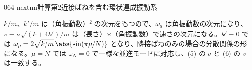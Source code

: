 \documentclass[uplatex,dvipdfmx,a4paper,11pt]{jsarticle}
\begin{document}
\begin{mondai}{064-nextnn}{計算}{第2近接ばねを含む環状連成振動系}
\begin{tadashii}
\kenzan $k/m$、$k'/m$ は（角振動数）$^{2}$ の次元をもつので、$\omega_{\mu}$ は角振動数の次元になり、$v=a\sqrt{(k+4k')/m}$ は（長さ）$\times$（角振動数）で速さの次元になる。$k'=0$ では $\omega_{\mu}=2\sqrt{k/m}\,\abs{\sin(\pi\mu/N)}$ となり、隣接ばねのみの場合の分散関係の形になる。$\mu=N$ では $\omega_N=0$ で一様な並進モードに対応し、(5) の $v$ と (6) の $v$ は一致する。
\end{tadashii}
\end{mondai}

\noteowari
\end{document}
